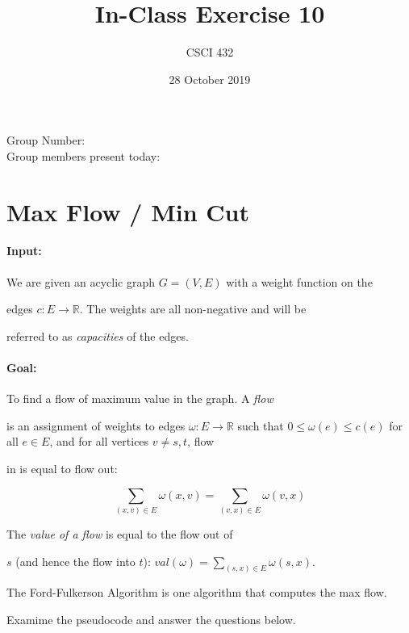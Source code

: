 \documentclass{article}
\title{In-Class Exercise 10}
\author{CSCI 432}
\date{28 October 2019}
\def\R{{\mathbb R}}
\begin{document}
\maketitle



\noindent

Group Number:\\

Group members present today:



\section*{Max Flow / Min Cut}



\paragraph{Input:} We are given an acyclic graph $G=(V,E)$ with a weight function on the

edges $c \colon E \to \R$.  The weights are all non-negative and will be

referred to as \emph{capacities} of the edges.



\paragraph{Goal:} To find a flow of maximum value in the graph.  A \emph{flow}

is an assignment of weights to edges $\omega \colon E \to \R$ such that $0 \leq

\omega(e) \leq c(e)$ for all $e \in E$, and for all vertices $v \neq s,t$, flow

in is equal to flow out:

$$ \sum_{(x,v) \in E} \omega(x,v) = \sum_{(v,x) \in E} \omega(v,x) $$

The \emph{value of a flow} is equal to the flow out of

$s$ (and hence the flow into $t$): $val(\omega) = \sum_{(s,x) \in E}

\omega(s,x).$



The Ford-Fulkerson Algorithm is one algorithm that computes the max flow.

Examime the pseudocode and answer the questions below.
\end{document}
